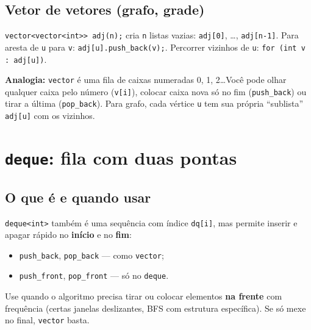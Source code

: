 \subsection{Vetor de vetores (grafo, grade)}

\texttt{vector<vector<int>> adj(n);} cria \texttt{n} listas vazias: \texttt{adj[0]}, \ldots, \texttt{adj[n-1]}.
Para aresta de \texttt{u} para \texttt{v}: \texttt{adj[u].push\_back(v);}.
Percorrer vizinhos de \texttt{u}: \texttt{for (int v : adj[u])}.

\begin{exemplodiabox}
\textbf{Analogia:} \texttt{vector} é uma fila de caixas numeradas 0, 1, 2\ldots Você pode olhar qualquer caixa pelo número (\texttt{v[i]}), colocar caixa nova só no fim (\texttt{push\_back}) ou tirar a última (\texttt{pop\_back}). Para grafo, cada vértice \texttt{u} tem sua própria ``sublista'' \texttt{adj[u]} com os vizinhos.
\end{exemplodiabox}



\section{\texttt{deque}: fila com duas pontas}

\subsection{O que é e quando usar}

\texttt{deque<int>} também é uma sequência com índice \texttt{dq[i]}, mas permite inserir e apagar rápido no \textbf{início} e no \textbf{fim}:

\begin{itemize}[nosep]
  \item \texttt{push\_back}, \texttt{pop\_back} --- como \texttt{vector};
  \item \texttt{push\_front}, \texttt{pop\_front} --- só no \texttt{deque}.
\end{itemize}

Use quando o algoritmo precisa tirar ou colocar elementos \textbf{na frente} com frequência (certas janelas deslizantes, BFS com estrutura específica). Se só mexe no final, \texttt{vector} basta.

